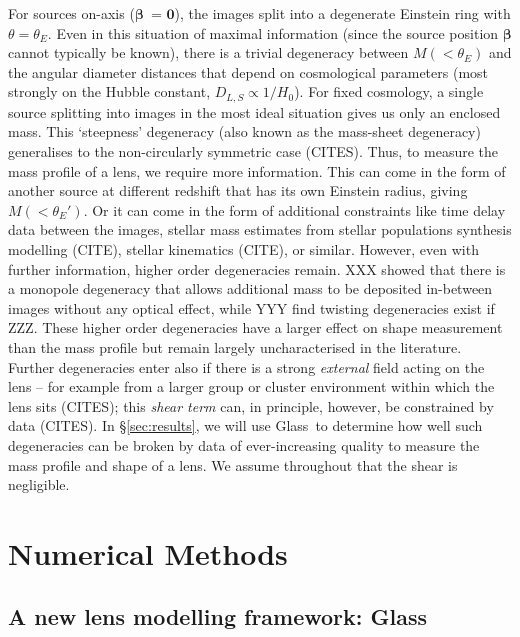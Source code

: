 \documentclass[galley]{mn2e}
\newcommand{\Glass}{{\sc Glass}}
\renewcommand{\vec}[1]{\ensuremath{\boldsymbol{#1}}}
\begin{document}
For sources on-axis (\vec\beta\ = \vec0), the images split into a degenerate Einstein ring with $\theta = \theta_E$. Even in this situation of maximal information (since the source position $\vec\beta$ cannot typically be known), there is a trivial degeneracy between $M(<\theta_E)$ and the angular diameter distances that depend on cosmological parameters (most strongly on the Hubble constant, $D_{L,S} \propto 1/H_0$). For fixed cosmology, a single source splitting into images in the most ideal situation gives us only an enclosed mass. This `steepness' degeneracy (also known as the mass-sheet degeneracy) generalises to the non-circularly symmetric case (CITES). Thus, to measure the mass profile of a lens, we require more information. This can come in the form of another source at different redshift that has its own Einstein radius, giving $M(<\theta_E')$. Or it can come in the form of additional constraints like time delay data between the images, stellar mass estimates from stellar populations synthesis modelling (CITE), stellar kinematics (CITE), or similar. However, even with further information, higher order degeneracies remain. XXX showed that there is a monopole degeneracy that allows additional mass to be deposited in-between images without any optical effect, while YYY find twisting degeneracies exist if ZZZ. These higher order degeneracies have a larger effect on shape measurement than the mass profile but remain largely uncharacterised in the literature. Further degeneracies enter also if there is a strong {\it external} field acting on the lens -- for example from a larger group or cluster environment within which the lens sits (CITES); this {\it shear term} can, in principle, however, be constrained by data (CITES). In \S\ref{sec:results}, we will use \Glass\ to determine how well such degeneracies can be broken by data of ever-increasing quality to measure the mass profile and shape of a lens. We assume throughout that the shear is negligible. 

\section{Numerical Methods}\label{sec:glass}

\subsection{A new lens modelling framework: \Glass}
\end{document}
